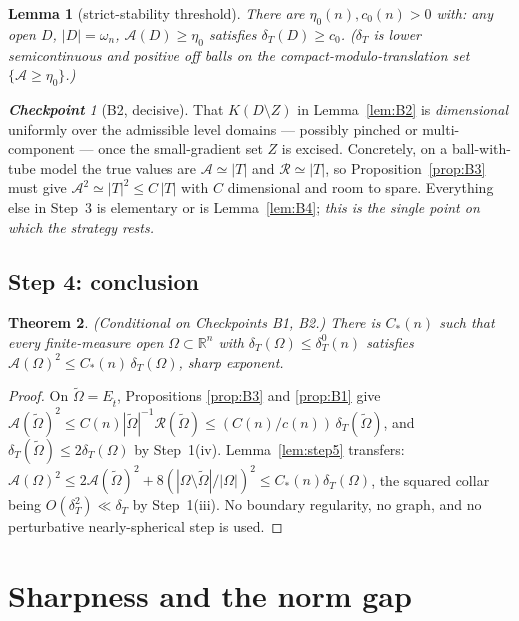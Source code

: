 \documentclass[11pt]{amsart}
\newtheorem{theorem}{Theorem}[section]
\newtheorem{lemma}[theorem]{Lemma}
\theoremstyle{definition}
\theoremstyle{remark}
\newtheorem*{checkpoint}{\textbf{Checkpoint}}
\newcommand{\Om}{\Omega}
\newcommand{\Ot}{\widetilde\Omega}
\newcommand{\Et}{E_{\hat t}}
\newcommand{\dT}{\delta_T}
\newcommand{\Asym}{\mathcal A}
\newcommand{\R}{\mathcal R}
\newcommand{\Rn}{\mathbb R^n}
\begin{document}
\begin{lemma}[strict-stability threshold]\label{lem:B5}
There are $\eta_0(n),c_0(n)>0$ with: any open $D$, $|D|=\omega_n$,
$\Asym(D)\ge\eta_0$ satisfies $\dT(D)\ge c_0$. \textup{(}$\dT$ is lower
semicontinuous and positive off balls on the compact-modulo-translation set
$\{\Asym\ge\eta_0\}$.\textup{)}
\end{lemma}
\begin{checkpoint}[B2, decisive]
That $K(D\setminus Z)$ in Lemma~\ref{lem:B2} is \emph{dimensional} uniformly
over the admissible level domains --- possibly pinched or multi-component ---
once the small-gradient set $Z$ is excised. Concretely, on a ball-with-tube
model the true values are $\Asym\simeq|T|$ and $\R\simeq|T|$, so
Proposition~\ref{prop:B3} must give $\Asym^2\simeq|T|^2\le C\,|T|$ with $C$
dimensional and room to spare. Everything else in Step~3 is elementary or is
Lemma~\ref{lem:B4}; \emph{this is the single point on which the strategy
rests.}
\end{checkpoint}

\subsection{Step 4: conclusion}
\begin{theorem}\label{thm:B6}
\textup{(}Conditional on Checkpoints \textup{B1, B2.}\textup{)} There is
$C_*(n)$ such that every finite-measure open $\Om\subset\Rn$ with
$\dT(\Om)\le\dT^0(n)$ satisfies $\Asym(\Om)^2\le C_*(n)\,\dT(\Om)$, sharp
exponent.
\end{theorem}
\begin{proof}
On $\Ot=\Et$, Propositions \ref{prop:B3} and \ref{prop:B1} give
$\Asym(\Ot)^2\le C(n)|\Ot|^{-1}\R(\Ot)\le (C(n)/c(n))\,\dT(\Ot)$, and
$\dT(\Ot)\le2\dT(\Om)$ by Step~1(iv). Lemma~\ref{lem:step5} transfers:
$\Asym(\Om)^2\le2\Asym(\Ot)^2+8(|\Om\setminus\Ot|/|\Om|)^2
\le C_*(n)\dT(\Om)$, the squared collar being $O(\dT^2)\ll\dT$ by
Step~1(iii). No boundary regularity, no graph, and no perturbative
nearly-spherical step is used.
\end{proof}

\section{Sharpness and the norm gap}\label{sec:norm}
\end{document}
